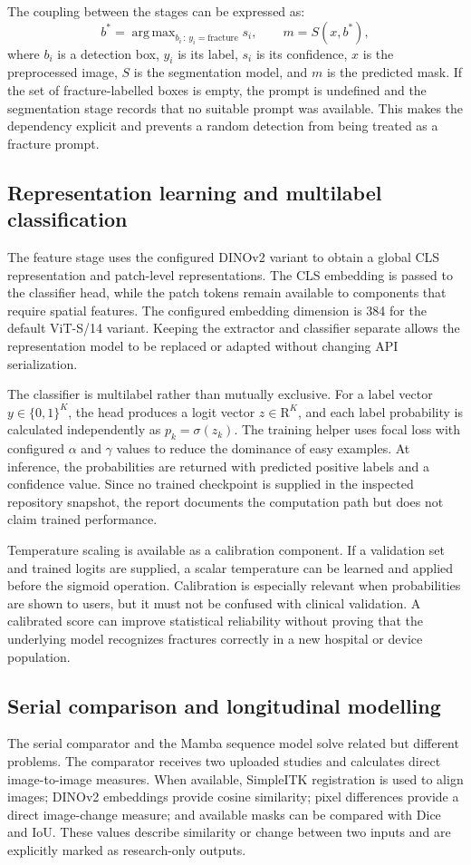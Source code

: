 \documentclass[12pt,a4paper]{article}
\begin{document}
The coupling between the stages can be expressed as:
\[
 b^* = \mathop{\mathrm{arg\,max}}_{b_i\, :\, y_i=\mathrm{fracture}} s_i,
 \qquad
 m = S(x,b^*),
\]
where $b_i$ is a detection box, $y_i$ is its label, $s_i$ is its confidence, $x$ is the preprocessed image, $S$ is the segmentation model, and $m$ is the predicted mask. If the set of fracture-labelled boxes is empty, the prompt is undefined and the segmentation stage records that no suitable prompt was available. This makes the dependency explicit and prevents a random detection from being treated as a fracture prompt.

\subsection{Representation learning and multilabel classification}
The feature stage uses the configured DINOv2 variant to obtain a global CLS representation and patch-level representations. The CLS embedding is passed to the classifier head, while the patch tokens remain available to components that require spatial features. The configured embedding dimension is 384 for the default ViT-S/14 variant. Keeping the extractor and classifier separate allows the representation model to be replaced or adapted without changing API serialization.

The classifier is multilabel rather than mutually exclusive. For a label vector $y\in\{0,1\}^{K}$, the head produces a logit vector $z\in\mathrm{R}^{K}$, and each label probability is calculated independently as $p_k=\sigma(z_k)$. The training helper uses focal loss with configured $\alpha$ and $\gamma$ values to reduce the dominance of easy examples. At inference, the probabilities are returned with predicted positive labels and a confidence value. Since no trained checkpoint is supplied in the inspected repository snapshot, the report documents the computation path but does not claim trained performance.

Temperature scaling is available as a calibration component. If a validation set and trained logits are supplied, a scalar temperature can be learned and applied before the sigmoid operation. Calibration is especially relevant when probabilities are shown to users, but it must not be confused with clinical validation. A calibrated score can improve statistical reliability without proving that the underlying model recognizes fractures correctly in a new hospital or device population.

\subsection{Serial comparison and longitudinal modelling}
The serial comparator and the Mamba sequence model solve related but different problems. The comparator receives two uploaded studies and calculates direct image-to-image measures. When available, SimpleITK registration is used to align images; DINOv2 embeddings provide cosine similarity; pixel differences provide a direct image-change measure; and available masks can be compared with Dice and IoU. These values describe similarity or change between two inputs and are explicitly marked as research-only outputs.
\end{document}
